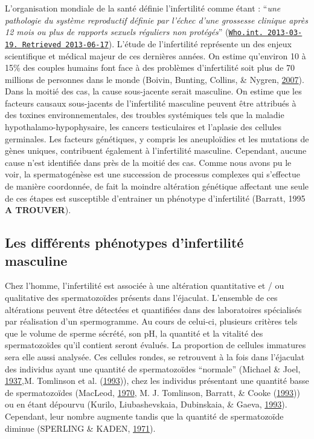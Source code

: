 \documentclass[12pt,twoside]{reedthesis}
\theoremstyle{definition}
\theoremstyle{definition}
\theoremstyle{remark}
\begin{document}
  L'organisation mondiale de la santé définie l'infertilité comme étant :
  ``\emph{une pathologie du système reproductif définie par l'échec d'une
  grossesse clinique après 12 mois ou plus de rapports sexuels réguliers
  non protégés}''
  (\href{http://www.who.int/reproductivehealth/topics/infertility/definitions/en/}{\texttt{Who.int.\ 2013-03-19.\ Retrieved\ 2013-06-17}}).
  L'étude de l'infertilité représente un des enjeux scientifique et
  médical majeur de ces dernières années. On estime qu'environ 10 à 15\%
  des couples humains font face à des problèmes d'infertilité soit plus de
  70 millions de personnes dans le monde (Boivin, Bunting, Collins, \&
  Nygren, \protect\hyperlink{ref-Boivin2007a}{2007}). Dans la moitié des
  cas, la cause sous-jacente serait masculine. On estime que les facteurs
  causaux sous-jacents de l'infertilité masculine peuvent être attribués à
  des toxines environnementales, des troubles systémiques tels que la
  maladie hypothalamo-hypophysaire, les cancers testiculaires et l'aplasie
  des cellules germinales. Les facteurs génétiques, y compris les
  aneuploïdies et les mutations de gènes uniques, contribuent également à
  l'infertilité masculine. Cependant, aucune cause n'est identifiée dans
  près de la moitié des cas. Comme nous avons pu le voir, la
  spermatogénèse est une succession de processus complexes qui s'effectue
  de manière coordonnée, de fait la moindre altération génétique affectant
  une seule de ces étapes est susceptible d'entrainer un phénotype
  d'infertilité (Barratt, 1995 \textbf{A TROUVER}).
  
  \subsection{Les différents phénotypes d'infertilité
  masculine}\label{les-differents-phenotypes-dinfertilite-masculine}
  
  Chez l'homme, l'infertilité est associée à une altération quantitative
  et / ou qualitative des spermatozoïdes présents dans l'éjaculat.
  L'ensemble de ces altérations peuvent être détectées et quantifiées dans
  des laboratoires spécialisés par réalisation d'un spermogramme. Au cours
  de celui-ci, plusieurs critères tels que le volume de sperme sécrété,
  son pH, la quantité et la vitalité des spermatozoïdes qu'il contient
  seront évalués. La proportion de cellules immatures sera elle aussi
  analysée. Ces cellules rondes, se retrouvent à la fois dans l'éjaculat
  des individus ayant une quantité de spermatozoïdes ``normale'' (Michael
  \& Joel, \protect\hyperlink{ref-Michael1937}{1937},M. Tomlinson et al.
  (\protect\hyperlink{ref-Tomlinson1993a}{1993})), chez les individus
  présentant une quantité basse de spermatozoïdes (MacLeod,
  \protect\hyperlink{ref-MacLeod1970}{1970}, M. J. Tomlinson, Barratt, \&
  Cooke (\protect\hyperlink{ref-Tomlinson1993}{1993})) ou en étant
  dépourvu (Kurilo, Liubashevskaia, Dubinskaia, \& Gaeva,
  \protect\hyperlink{ref-Kurilo}{1993}). Cependant, leur nombre augmente
  tandis que la quantité de spermatozoïde diminue (SPERLING \& KADEN,
  \protect\hyperlink{ref-SPERLING1971}{1971}).
  
\end{document}
